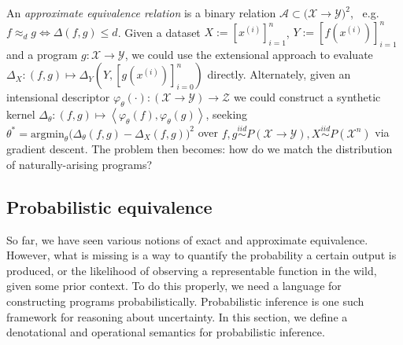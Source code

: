 \documentclass[11pt]{article}
\begin{document}
    \noindent An \textit{approximate equivalence relation} is a binary relation $\mathcal{A} \subset \mathcal (\mathcal X → \mathcal Y)^2$,~ e.g. $f \approx_{d} g \Leftrightarrow \mathbb \Delta(f, g) \leq d$. Given a dataset $X := [x^{(i)}]_{i=1}^n$, $Y := [f(x^{(i)})]_{i=1}^n$ and a program $g: \mathcal{X} → \mathcal{Y}$, we could use the extensional approach to evaluate $\Delta_X: (f, g) \mapsto \Delta_Y(Y, [g(x^{(i)})]_{i=0}^n)$ directly. Alternately, given an intensional descriptor $\varphi_θ(\cdot): (\mathcal X → \mathcal Y) → \mathcal Z$ we could construct a synthetic kernel $\Delta_θ: (f, g) \mapsto \left<\varphi_θ(f), \varphi_θ(g)\right>$, seeking $θ^* = \text{argmin}_θ\big(\Delta_θ(f, g) - \Delta_X(f, g)\big)^2$ over $f, g \overset{iid}{\sim} P(\mathcal X → \mathcal Y), X \overset{iid}{\sim} P(\mathcal X^n)$ via gradient descent. The problem then becomes: how do we match the distribution of naturally-arising programs?




    \pagebreak\subsection{Probabilistic equivalence}\label{sec:pr-eq}

    So far, we have seen various notions of exact and approximate equivalence. However, what is missing is a way to quantify the probability a certain output is produced, or the likelihood of observing a representable function in the wild, given some prior context. To do this properly, we need a language for constructing programs probabilistically. Probabilistic inference is one such framework for reasoning about uncertainty. In this section, we define a denotational and operational semantics for probabilistic inference. \\
\end{document}
